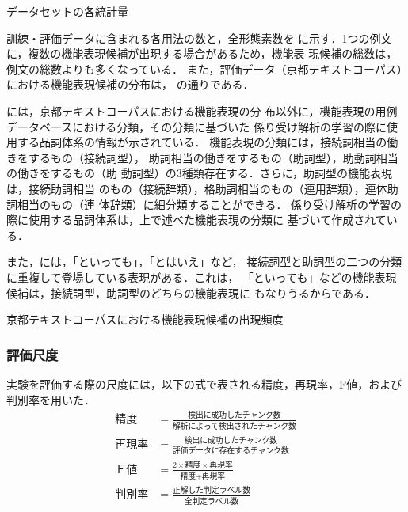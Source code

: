 \documentclass[japanese]{jnlp_1.3e}
\begin{document}
\begin{table}[t]
 \caption{データセットの各統計量}
 \label{tbl:dataset}

\end{table}


訓練・評価データに含まれる各用法の数と，全形態素数を
に示す．1つの例文に，複数の機能表現候補が出現する場合があるため，機能表
現候補の総数は，例文の総数よりも多くなっている．
また，評価データ（京都テキストコーパス）における機能表現候補の分布は，
の通りである．

には，京都テキストコーパスにおける機能表現の分
布以外に，機能表現の用例データベースにおける分類，その分類に基づいた
係り受け解析の学習の際に使用する品詞体系の情報が示されている．
機能表現の分類には，接続詞相当の働きをするもの（接続詞型），
助詞相当の働きをするもの（助詞型），助動詞相当の働きをするもの（助
動詞型）の3種類存在する．さらに，助詞型の機能表現は，接続助詞相当
のもの（接続辞類），格助詞相当のもの（連用辞類），連体助詞相当のもの（連
体辞類）に細分類することができる．
係り受け解析の学習の際に使用する品詞体系は，上で述べた機能表現の分類に
基づいて作成されている．

また，には，「といっても」，「とはいえ」など，
接続詞型と助詞型の二つの分類に重複して登場している表現がある．これは，
「といっても」などの機能表現候補は，接続詞型，助詞型のどちらの機能表現に
もなりうるからである．

\begin{table}[p]
  \caption{京都テキストコーパスにおける機能表現候補の出現頻度}
\vspace{-2pt}
  \label{tbl:kyoto_FE_freq1}

\end{table}





\subsubsection{評価尺度}
\label{subsec:評価尺度}

実験を評価する際の尺度には，以下の式で表される精度，再現率，F値，および
判別率を用いた．
{\allowdisplaybreaks
\begin{align*}
  \mbox{精度} &= \frac{\mbox{検出に成功したチャンク数}}{\mbox{解析によって検出されたチャンク数}} \\[1zw]
  \mbox{再現率} &= \frac{\mbox{検出に成功したチャンク数}}{\mbox{評価データに存在するチャンク数}} \\[1zw]
  \mbox{Ｆ値} &= \frac{2 \times \mbox{精度} \times \mbox{再現率}}{\mbox{精度} + \mbox{再現率}}  \\[1zw]
  \mbox{判別率} &= \frac{\mbox{正解した判定ラベル数}}{\mbox{全判定ラベル数}} 
\end{align*}
}
\end{document}
